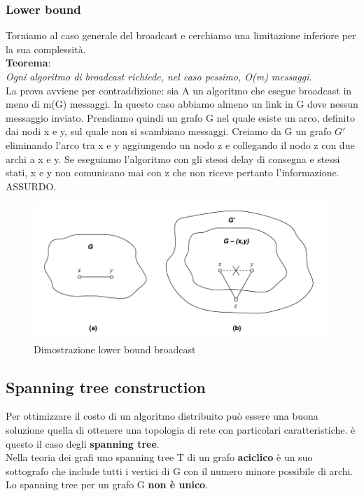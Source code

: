 \documentclass[12pt]{article}
\begin{document}
		\subsubsection{Lower bound}
			Torniamo al caso generale del broadcast e cerchiamo una limitazione inferiore per la sua complessità.\\ \textbf{Teorema}:\\
			\textit{Ogni algoritmo di broadcast richiede, nel caso pessimo, O(m) messaggi}.\\
			La prova avviene per contraddizione: sia A un algoritmo che esegue broadcast in meno di m(G) messaggi. In questo caso abbiamo almeno un link in G dove nessun messaggio inviato. Prendiamo quindi un grafo G nel quale esiste un arco, definito dai nodi x e y, sul quale non si scambiano messaggi. Creiamo da G un grafo $G'$ eliminando l'arco tra x e y aggiungendo un nodo z e collegando il nodo z con due archi a x e y. Se eseguiamo l'algoritmo con gli stessi delay di consegna e stessi stati, x e y non comunicano mai con z che non riceve pertanto l'informazione. ASSURDO.
				
			\begin{figure}[h!]
				\centering
				\includegraphics[scale=0.35]{img/lower.png}
				\caption{Dimostrazione lower bound broadcast}
			\end{figure}
			
			
	\subsection{Spanning tree construction}
		Per ottimizzare il costo di un algoritmo distribuito può essere una buona soluzione quella di ottenere una topologia di rete con particolari caratteristiche. è questo il caso degli \textbf{spanning tree}.\\
		Nella teoria dei grafi uno spanning tree T di un grafo \textbf{aciclico} è un suo sottografo che include tutti i vertici di G con il numero minore possibile di archi. Lo spanning tree per un grafo G \textbf{non è unico}.
\end{document}

